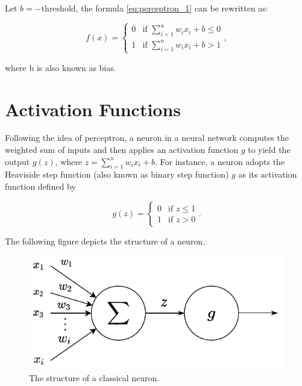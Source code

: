 \documentclass[
	parskip, 			   %
	twoside, 			   %
	DIV=14, 			   %
	BCOR=15.0mm, 		   %
	headsepline, 		   %
	open=right, 		   %
	captions=tableheading, %
	bibliography=totoc,    %
	numbers=noenddot       %
]{scrreprt}
\begin{document}
Let $b=-\text{threshold}$, the formula \ref{eq:perceptron_1} can be rewritten as:

\begin{equation}
    \label{eq:perceptron_2}
    f(x)=\begin{cases}0 & \text{if } \sum\nolimits_{i=1}^n w_{i} x_{i}+b \leq 0 \\ 1 & \text{if } \sum\nolimits_{i=1}^n w_{i} x_{i}+b>1\end{cases},
\end{equation}

where b is also known as bias. 

\section{Activation Functions}
Following the idea of perceptron, a neuron in a neural network computes the weighted sum of inputs and then applies an activation function $g$ to yield the output $g(z)$, where $z=\sum\nolimits_{i=1}^n w_{i} x_{i} + b$. For instance, a neuron adopts the Heaviside step function (also known as binary step function) $g$ as its activation function defined by

\begin{equation}
    \label{eq:activation_function}
    g(z)=\begin{cases} 0 & \text{if } z\leq 1 \\ 1  & \text{if } z>0
    \end{cases}.
\end{equation}

The following figure depicts the structure of a neuron.

\begin{figure}[h!]
    \centering
    \includegraphics[scale=1]{figures/activation_function.pdf}
    \caption{The structure of a classical neuron.}
    \label{fig:neuron_structure}
\end{figure}
\end{document}
